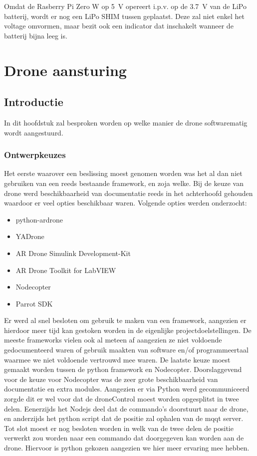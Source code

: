 Omdat de Rasberry Pi Zero W op \SI{5}{\V} opereert i.p.v. op de \SI{3.7}{\V} van de LiPo batterij, wordt er nog een LiPo SHIM tussen geplaatst. Deze zal niet enkel het voltage omvormen, maar bezit ook een indicator dat inschakelt wanneer de batterij bijna leeg is.

\section{Drone aansturing} \label{sec:drone_control}


\subsection{Introductie} \label{sec:initiele_planning}

In dit hoofdstuk zal besproken worden op welke manier de drone softwarematig wordt aangestuurd.

\subsubsection{Ontwerpkeuzes}

Het eerste waarover een beslissing moest genomen worden was het al dan niet gebruiken van een reeds bestaande framework, en zoja welke. Bij de keuze van drone werd beschikbaarheid van documentatie reeds in het achterhoofd gehouden waardoor er veel opties beschikbaar waren. Volgende opties werden onderzocht:

\begin{itemize}
\item python-ardrone
\item YADrone
\item AR Drone Simulink Development-Kit
\item AR Drone Toolkit for LabVIEW
\item Nodecopter
\item Parrot SDK
\end{itemize}

Er werd al snel besloten om gebruik te maken van een framework, aangezien er hierdoor meer tijd kan gestoken worden in de eigenlijke projectdoelstellingen. De meeste frameworks vielen ook al meteen af aangezien ze niet voldoende gedocumenteerd waren of gebruik maakten van software en/of programmeertaal waarmee we niet voldoende vertrouwd mee waren. De laatste keuze moest gemaakt worden tussen de python framework en Nodecopter. Doorslaggevend voor de keuze voor Nodecopter was de zeer grote beschikbaarheid van documentatie en extra modules. Aangezien er via Python werd gecommuniceerd zorgde dit er wel voor dat de droneControl moest worden opgesplitst in twee delen. Eenerzijds het Nodejs deel dat de commando's doorstuurt naar de drone, en anderzijds het python script dat de positie zal ophalen van de mqqt server. Tot slot moest er nog besloten worden in welk van de twee delen de positie verwerkt zou worden naar een commando dat doorgegeven kan worden aan de drone. Hiervoor is python gekozen aangezien we hier meer ervaring mee hebben.




